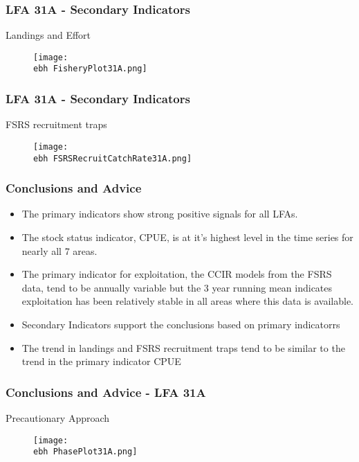 \documentclass{beamer}
\newcommand{\ebh}{\string~/bio.data/bio.lobster/figures/Assessment/LFA2732/} %
\begin{document}
\begin{frame}
\frametitle{LFA 31A - Secondary Indicators}
Landings and Effort
\begin{figure}
        \begin{center}
            \texttt{[image: \\ebh FisheryPlot31A.png]}
        \end{center}
    \end{figure}
\end{frame}



\begin{frame}
\frametitle{LFA 31A - Secondary Indicators}
FSRS recruitment traps
\begin{figure}
        \begin{center}
            \texttt{[image: \\ebh FSRSRecruitCatchRate31A.png]}
        \end{center}
    \end{figure}
\end{frame}




\begin{frame}
\frametitle{Conclusions and Advice}
\begin{itemize}

\item The primary indicators show strong positive signals for all LFAs. 
\item The stock status indicator, CPUE, is at it’s highest level in the time series for nearly all 7 areas. 
\item The primary indicator for exploitation, the CCIR models from the FSRS data, tend to be annually variable but the 3 year running mean indicates exploitation has been relatively stable in all areas where this data is available. 
\item Secondary Indicators support the conclusions based on primary indicatorrs
\item The trend in landings and FSRS recruitment traps tend to be similar to the trend in the primary indicator CPUE
\end{itemize}
\end{frame}





\begin{frame}
\frametitle{Conclusions and Advice - LFA 31A}
Precautionary Approach
\begin{figure}
        \begin{center}
            \texttt{[image: \\ebh PhasePlot31A.png]}
        \end{center}
    \end{figure}
\end{frame}
\end{document}
